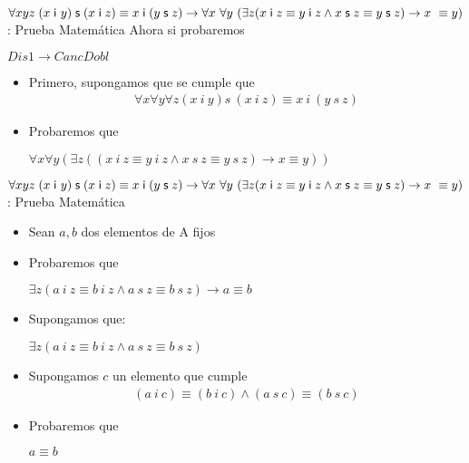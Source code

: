 \documentclass[10pt]{beamer}
\newcommand{\Cfonti}{\fontsize{8.5}{7.2}\selectfont}
\newcommand{\acot}{Dis1\rightarrow CancDobl}
\newcommand{\idistr}{\forall xyz\;(x\;\mathsf{i}\
y)\;\mathsf{s}\;(x\;\mathsf{i}\;z)\equiv x\;\mathsf{i}\;(y\;\mathsf{s}%
\;z)}
\newcommand{\myconj}{x\;\mathsf{i}\;z\equiv y\;\mathsf{%
i}\;z\wedge x\;\mathsf{s}\;z\equiv y\;\mathsf{s}\;z}
\begin{document}
\begin{frame}{\Cfonti$\idistr \rightarrow \forall x\ \forall y\ (\exists z (\myconj) \rightarrow x\ \equiv y)$:
   Prueba Matemática}
  Ahora si probaremos
  \begin{center}
    $\acot$
  \end{center}
  \pause
  \begin{itemize}[<+->]

    \item Primero, supongamos que se cumple que
    \begin{align}
      \forall x \forall y \forall z (x\ i\ y) s\ (x\ i\ z) \equiv x\ i\ (y\ s\ z) \label{eq11}
    \end{align}
    \item Probaremos que
    \begin{center}
      $\forall x \forall y (\exists z ((x\ i\ z \equiv y\ i\ z \wedge x\ s\ z \equiv y\ s\ z) \rightarrow x \equiv y))$
    \end{center}

  \end{itemize}
\end{frame}


\begin{frame}{\Cfonti$\idistr \rightarrow \forall x\ \forall y\ (\exists z (\myconj) \rightarrow x\ \equiv y)$:
   Prueba Matemática}
  \begin{itemize}[<+->]

    \item Sean $a, b$ dos elementos de A fijos
    \item Probaremos que
    \begin{center}
      $\exists z (a\ i\ z \equiv b\ i\ z \wedge a\ s\ z \equiv b\ s\ z) \rightarrow a \equiv b$
    \end{center}
    \item Supongamos que:
    \begin{center}
      $\exists z (a\ i\ z \equiv b\ i\ z \wedge a\ s\ z \equiv b\ s\ z)$
    \end{center}

    \item Supongamos $c$ un elemento que cumple
    \begin{align}
      (a\ i\ c) \equiv (b\ i\ c) \wedge (a\ s\ c) \equiv (b\ s\ c)
    \end{align}
    \item Probaremos que
    \begin{center}
      $a \equiv b$
    \end{center}
  \end{itemize}
\end{frame}
\end{document}
